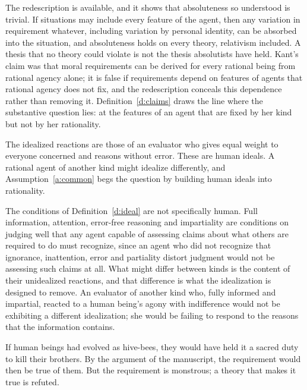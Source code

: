 \documentclass{situationist-preprint}
\begin{document}
\begin{reply}
The redescription is available, and it shows that absoluteness so understood is trivial. If situations may include every feature of the agent, then any variation in requirement whatever, including variation by personal identity, can be absorbed into the situation, and absoluteness holds on every theory, relativism included. A thesis that no theory could violate is not the thesis absolutists have held. Kant's claim was that moral requirements can be derived for every rational being from rational agency alone; it is false if requirements depend on features of agents that rational agency does not fix, and the redescription conceals this dependence rather than removing it. Definition~\ref{d:claims} draws the line where the substantive question lies: at the features of an agent that are fixed by her kind but not by her rationality.
\end{reply}

\begin{objection}
The idealized reactions are those of an evaluator who gives equal weight to everyone concerned and reasons without error. These are human ideals. A rational agent of another kind might idealize differently, and Assumption~\ref{a:common} begs the question by building human ideals into rationality.
\end{objection}

\begin{reply}
The conditions of Definition~\ref{d:ideal} are not specifically human. Full information, attention, error-free reasoning and impartiality are conditions on judging well that any agent capable of assessing claims about what others are required to do must recognize, since an agent who did not recognize that ignorance, inattention, error and partiality distort judgment would not be assessing such claims at all. What might differ between kinds is the content of their unidealized reactions, and that difference is what the idealization is designed to remove. An evaluator of another kind who, fully informed and impartial, reacted to a human being's agony with indifference would not be exhibiting a different idealization; she would be failing to respond to the reasons that the information contains.
\end{reply}

\begin{objection}
If human beings had evolved as hive-bees, they would have held it a sacred duty to kill their brothers. By the argument of the manuscript, the requirement would then be true of them. But the requirement is monstrous; a theory that makes it true is refuted.
\end{objection}
\end{document}
